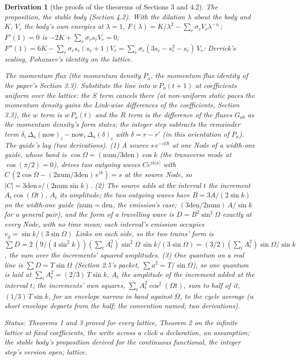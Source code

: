 \documentclass[pdflatex,sn-mathphys-num]{sn-jnl}
\newcommand{\num}{\mathrm{num}}
\newcommand{\den}{\mathrm{den}}
\theoremstyle{thmstyleone}
\newtheorem{derivation}{Derivation}
\begin{document}
\begin{derivation}[the proofs of the theorems of Sections 3 and 4.2]
\emph{The proposition, the stable body (Section 4.2).} With the dilation $\lambda$ about the body and $K$, $V_r$ the body's own energies at $\lambda = 1$, $F(\lambda) = K / \lambda^2 - \sum_r \sigma_r V_r \lambda^{-s_r}$; $F'(1) = 0$ is $-2K + \sum_r \sigma_r s_r V_r = 0$; $F''(1) = 6K - \sum_r \sigma_r s_r (s_r + 1) V_r = \sum_r \sigma_r (3s_r - s_r^2 - s_r)\,V_r$: Derrick's scaling, Pohozaev's identity on the lattice.

\emph{The momentum flux (the momentum density $P_a$, the momentum flux identity of the paper's Section 3.3).} Substitute the line into $w\,P_a(t + 1)$ at coefficients uniform over the lattice: the $S$ term cancels there (at non-uniform static paces the momentum density gains the Link-wise differences of the coefficients, Section 3.3), the $w$ term is $w\,P_a(t)$ and the $R$ term is the difference of the fluxes $G_{ab}$ as the momentum density's form states; the integer step subtracts the remainder term $\delta_i\,\Delta_a(\mathrm{now})_i - \mathrm{now}_i\,\Delta_a(\delta)_i$ with $\delta = r - r'$ (in this orientation of $P_a$).
\emph{The guide's lay (two derivations).} (1) A source $s\,e^{-i\Omega t}$ at one Node of a width-one guide, whose band is $\cos\Omega = (\num / 3\den)\cos k$ (the transverse mode at $\cos(\pi / 2) = 0$), drives two outgoing waves $C e^{ik|x|}$ with $C\,(2\cos\Omega - (2\num / 3\den)\,e^{ik}) = s$ at the source Node, so $|C| = 3\den\,s / (2\num\sin k)$. (2) The source adds at the interval $t$ the increment $A_t\cos(\Omega t)$, $A_t$ its amplitude; the two outgoing waves have $B = 3A / (2\sin k)$ on the width-one guide ($\num = \den$, the emission's case; $(3\den / 2\num)\,A / \sin k$ for a general pair), and the form of a travelling wave is $D = B^2\sin^2\Omega$ exactly at every Node, with no time mean; each interval's emission occupies $v_g = \sin k / (3\sin\Omega)$ Links on each side, so the two trains' form is $\sum D = 2\,(9 / (4\sin^2 k))(\sum_t A_t^2)\sin^2\Omega\,\sin k / (3\sin\Omega) = (3 / 2)(\sum_t A_t^2)\sin\Omega / \sin k$, the sum over the increments' squared amplitudes. (3) One quantum on a real line is $\sum D = T\sin\Omega$ (Section 2.5's packet, $\sum a^2 = T / \sin\Omega$), so one quantum is laid at $\sum_t A_t^2 = (2 / 3)\,T\sin k$, $A_t$ the amplitude of the increment added at the interval $t$; the increments' own squares, $\sum_t A_t^2\cos^2(\Omega t)$, sum to half of it, $(1 / 3)\,T\sin k$, for an envelope narrow in band against $\Omega$, to the cycle average (a short envelope departs from the half; the convention named; two derivations).

\emph{Status:} Theorems 1 and 3 proved for every lattice, Theorem 2 on the infinite lattice at fixed coefficients, the write across a click a declaration, an assumption; the stable body's proposition derived for the continuous functional, the integer step's version open; lattice.
\end{derivation}
\end{document}
